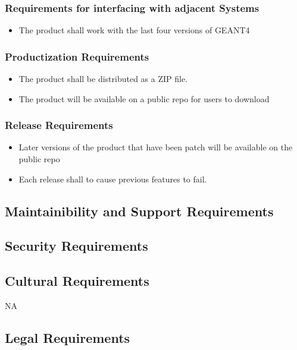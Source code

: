 \documentclass[12pt]{article}
\begin{document}
\subsubsection{Requirements for interfacing with adjacent Systems}
\begin{itemize}
\item The product shall work with the last four versions of GEANT4
\end{itemize}
\subsubsection{Productization Requirements}
\begin{itemize}
\item The product shall be distributed as a ZIP file.
\item The product will be available on a public repo for users to download
\end{itemize}
\subsubsection{Release Requirements}
\begin{itemize}
\item Later versions of the product that have been patch will be available on the public repo
\item Each release shall to cause previous features to fail.
\end{itemize}
\subsection{Maintainibility and Support Requirements} %
\subsection{Security Requirements} %
\subsection{Cultural Requirements} %
NA
\subsection{Legal Requirements} %
\end{document}

